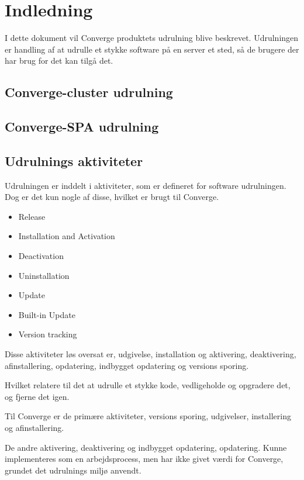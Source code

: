 \chapter{Indledning}

I dette dokument vil Converge produktets udrulning blive beskrevet. Udrulningen er handling af at udrulle et stykke software på en server et sted, så de brugere der har brug for det kan tilgå det.

\section{Converge-cluster udrulning}

\section{Converge-SPA udrulning}

\section{Udrulnings aktiviteter}

Udrulningen er inddelt i aktiviteter, som er defineret for software udrulningen. Dog er det kun nogle af disse, hvilket er brugt til Converge.

\begin{itemize}
    \item Release
    \item Installation and Activation
    \item Deactivation
    \item Uninstallation
    \item Update
    \item Built-in Update
    \item Version tracking
\end{itemize}

Disse aktiviteter løs oversat er, udgivelse, installation og aktivering, deaktivering, afinstallering, opdatering, indbygget opdatering og versions sporing.

Hvilket relatere til det at udrulle et stykke kode, vedligeholde og opgradere det, og fjerne det igen.

Til Converge er de primære aktiviteter, versions sporing, udgivelser, installering og afinstallering.

De andre aktivering, deaktivering og indbygget opdatering, opdatering. Kunne implementeres som en arbejdsprocess, men har ikke givet værdi for Converge, grundet det udrulnings miljø anvendt.

